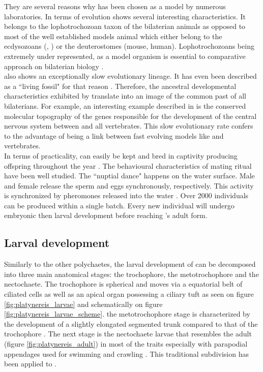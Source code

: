      They are several reasons why \platy{} has been chosen as a model by numerous laboratories. In terms of evolution \platy{} shows several interesting characteristics. It belongs to the lophotrochozoan taxon of the bilaterian animals as opposed to most of the well established models animal which either belong to the ecdysozoans (, ) or the deuterostomes (mouse, human). Lophotrochozoans being extremely under represented, \platy{} as a model organism is essential to comparative approach on bilaterian biology \cite{Fischer10}.\\
     
     \platy{} also shows an exceptionally slow evolutionary lineage. It has even been described as a ``living fossil" for that reason \cite{Fischer10}. Therefore, the ancestral developmental characteristics exhibited by \platy{} translate into an image of the common past of all bilaterians. For example, an interesting example described in \cite{denes07,tessmar07} is the conserved molecular topography of the genes responsible for the development of the central nervous system between \platy{} and all vertebrates. This slow evolutionary rate confers to \platy{} the advantage of being a link between fast evolving models like  and vertebrates.\\
     
     In terms of practicality, \platy{} can easily be kept and bred in captivity producing offspring throughout the year \cite{fischer04}. The behavioural characteristics of \platy{} mating ritual have been well studied. The ``nuptial dance" happens on the water surface. Male and female release the sperm and eggs synchronously, respectively. This activity is synchronized by pheromones released into the water \cite{zeeck98}. Over 2000 individuals can be produced within a single batch. Every new individual will undergo embryonic then larval development before reaching \platy{}'s adult form.\\

 
     \subsection{Larval development}
    Similarly to the other polychaetes, the larval development of \platy{} can be decomposed into three main anatomical stages: the trochophore, the metotrochophore and the nectochaete. The trochophore is spherical and moves via a equatorial belt of ciliated cells as well as an apical organ possessing a ciliary tuft \cite{rouse99,nielsen04} as seen on figure \ref{fig:platynereis_larvae} and schematically on figure \ref{fig:platynereis_larvae_scheme}. the metotrochophore stage is characterized by the development of a slightly elongated segmented trunk compared to that of the trochophore \cite{hacker98}. The next stage is the nectochaete larvae that resembles the adult (figure \ref{fig:platynereis_adult}) in most of the traits especially with parapodial appendages used for swimming and crawling \cite{hacker98}. This traditional subdivision has been applied to \platy{} \cite{hauenschild69}.\\
    
